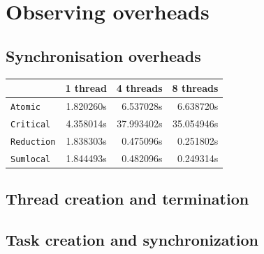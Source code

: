 \section{Observing overheads}
\label{sec:observing_overheads}

\subsection{Synchronisation overheads}

\begin{table}[H]
\centering
\begin{tabular}{lrrr}
\toprule
    & 1 thread & 4 threads & 8 threads \\
\midrule
    \texttt{Atomic}      & 1.820260s     & 6.537028s     & 6.638720s     \\
    \texttt{Critical}    & 4.358014s     & 37.993402s    & 35.054946s    \\
    \texttt{Reduction}   & 1.838303s     & 0.475096s     & 0.251802s     \\
    \texttt{Sumlocal}    & 1.844493s     & 0.482096s     & 0.249314s     \\
\bottomrule
\end{tabular}
\label{tab:}
\end{table}


\subsection{Thread creation and termination}

\subsection{Task creation and synchronization}



